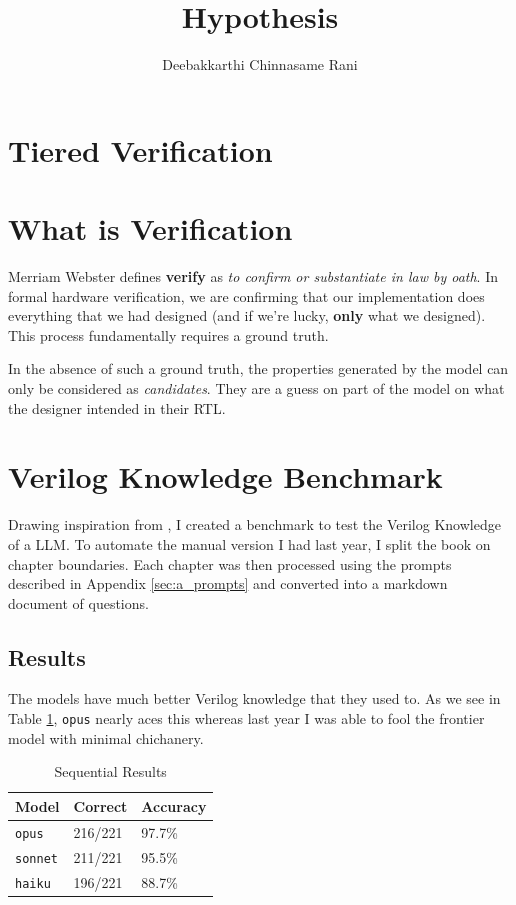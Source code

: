 \documentclass[letterpaper, 12pt]{article}
\title{Hypothesis}
\author{Deebakkarthi Chinnasame Rani}
\begin{document}
\maketitle
\thispagestyle{fancy}

\begin{abstract}
\end{abstract}

\section{Tiered Verification}

\section{What is Verification}
Merriam Webster defines \textbf{verify} as \textit{to confirm or substantiate
in law by oath}.
In formal hardware verification, we are confirming that our implementation
does everything that we had designed (and if we're lucky, \textbf{only} what
we designed). This process fundamentally requires a ground truth.

In the absence of such a ground truth, the properties generated by the model
can only be considered as \textit{candidates}. They are a guess on part of the
model on what the designer intended in their RTL.
\cite{Foster2005}

\section{Verilog Knowledge Benchmark}
Drawing inspiration from \cite{phanBenchmarkExpertlevelAcademic2026}, I created
a benchmark to test the Verilog Knowledge of a LLM. To automate the manual
version I had last year, I split the book
\cite{chonnadVerilogFrequentlyAsked2004}
on chapter boundaries. Each chapter was then processed using the
prompts described in Appendix \ref{sec:a_prompts} and converted into a
markdown document of questions.

\subsection{Results}
The models have much better Verilog knowledge that they used to. As we see in
Table \ref{tab:seq_results}, \texttt{opus} nearly aces this whereas last year
I was able to fool the frontier model with minimal chichanery.

\begin{table}[]
	\centering
	\begin{tabular}{@{}lll@{}}
		\toprule
		Model  & Correct & Accuracy \\ \midrule
		\texttt{opus}   & 216/221 & 97.7\%   \\ \midrule
		\texttt{sonnet} & 211/221 & 95.5\%   \\ \midrule
		\texttt{haiku}  & 196/221 & 88.7\%   \\ \bottomrule
	\end{tabular}
	\caption{Sequential Results}
	\label{tab:seq_results}
\end{table}
\end{document}
